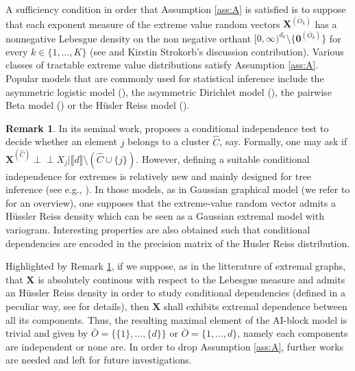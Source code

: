 \documentclass[11pt]{article}
\theoremstyle{definition}
\newtheorem{remark}{Remark}
\newcommand{\indep}{\perp \!\!\! \perp}
\begin{document}
	A sufficiency condition in order that Assumption \ref{ass:A} is satisfied is to suppose that each exponent measure of the extreme value random vectors $\textbf{X}^{(\bar{O}_k)}$ has a nonnegative Lebesgue density on the non negative orthant $[0,\infty)^{d_k} \setminus \{\textbf{0}^{(\bar{O}_k)}\}$ for every $k \in \{1, \dots, K\}$ (see \cite{engelke2020graphical} and Kirstin Strokorb's discussion contribution). Various classes of tractable extreme value distributions satisfy Assumption \ref{ass:A}. Popular models that are commonly used for statistical inference include the asymmetric logistic model (\cite{10.1093/biomet/77.2.245}), the asymmetric Dirichlet model (\cite{10.2307/2345748}), the pairwise Beta model (\cite{COOLEY20102103}) or the Hüsler Reiss model (\cite{HUSLER1989283}).
	\begin{remark}
		\label{rem:tree_model}
		In its seminal work, \cite{NIPS2017_37d097ca} proposes a conditional independence test to decide whether an element $j$ belongs to a cluster $\hat{C}$, say. Formally, one may ask if $\textbf{X}^{(\hat{C})} \indep X_j | \llbracket d \rrbracket \setminus (\hat{C} \cup \{j\})$. However, defining a suitable conditional independence for extremes is relatively new and mainly designed for tree inference (see e.g., \cite{asenova2021inference, engelke2020graphical,engelke2020structure, segers2020one}). In those models, as in Gaussian graphical model (we refer to \cite{lauritzen1996graphical} for an overview), one supposes that the extreme-value random vector admits a Hüssler Reiss density which can be seen as a Gaussian extremal model with variogram. Interesting properties are also obtained such that conditional dependencies are encoded in the precision matrix of the Husler Reiss distribution.
	\end{remark}
	Highlighted by Remark \ref{rem:tree_model}, if we suppose, as in the litterature of extremal graphs, that $\textbf{X}$ is absolutely continous with respect to the Lebesgue measure and admits an Hüssler Reiss density in order to study conditional dependencies (defined in a peculiar way, see \cite{engelke2020graphical} for details), then $\textbf{X}$ shall exhibits extremal dependence between all its components. Thus, the resulting maximal element of the AI-block model is trivial and given by $\bar{O} = \{ \{1\}, \dots, \{d\}\}$ or $\bar{O} = \{ 1,\dots,d\}$, namely each components are independent or none are. In order to drop Assumption \ref{ass:A}, further works are needed and left for future investigations.
	
\end{document}
